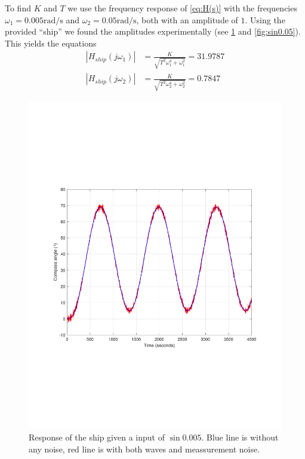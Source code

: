 To find $K$ and $T$ we use the frequency response of \cref{eq:H(s)} with the frequencies $\omega_1 = 0.005\si{\radian\per\second}$ and $\omega_2 = 0.05\si{\radian\per\second}$, both with an amplitude of $1$. Using the provided ``ship'' we found the amplitudes experimentally (see \cref{fig:sin0.005} and \cref{fig:sin0.05}). This yields the equations
\begin{subequations}
	\begin{align}
		|H_{ship}(j\omega_1)| &= \frac{K}{\sqrt{T^2\omega_1^4 + \omega_1^2}} = 31.9787 \label{eq:omega_1}\\
		|H_{ship}(j\omega_2)| &= \frac{K}{\sqrt{T^2\omega_2^4 + \omega_2^2}} = 0.7847 \label{eq:omega_2}
	\end{align}
\end{subequations}

\begin{figure}
	\centering
	\includegraphics[width=\textwidth]{images/oppg1/sin0005.pdf}
	\caption{Response of the ship given a input of \ensuremath{\sin{0.005}}.
		Blue line is without any noise, red line is with both waves and meassurement noise.}
	\label{fig:sin0.005}
\end{figure}

